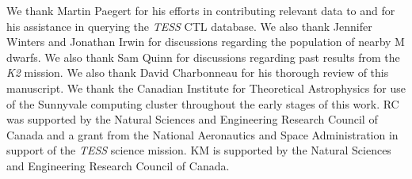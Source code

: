 \documentclass[twocolumn]{emulateapj}
\newcommand{\ktwo}[1]{\emph{K2}#1}
\newcommand{\tess}[1]{\emph{TESS}#1}
\begin{document}
\acknowledgements
We thank Martin Paegert for his efforts in contributing relevant data to and for his assistance in querying the \tess{}
CTL database. We also thank Jennifer Winters and Jonathan Irwin for discussions regarding the population of nearby
M dwarfs. We also thank Sam Quinn for discussions regarding past results from the \ktwo{} mission.
We also thank David Charbonneau for his thorough review of this manuscript.
We thank the Canadian Institute for Theoretical Astrophysics for use of the Sunnyvale computing cluster
throughout the early stages of this work. RC was supported by the Natural Sciences and Engineering Research Council of
Canada and a grant from the National Aeronautics and Space Administration in support of the \tess{} science mission.  KM is supported by the Natural Sciences and Engineering Research Council of Canada.



\end{document}
